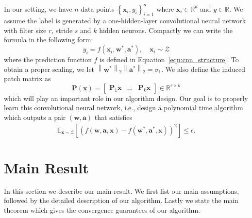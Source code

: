 \documentclass[11pt]{article}
\newcommand{\mat}[1]{\mathbf{#1}}
\newcommand{\vect}[1]{\mathbf{#1}}
\newcommand{\norm}[1]{\left\|#1\right\|}
\newcommand{\expect}{\mathbb{E}}
\newcommand{\inputdist}{\mathcal{Z}}
\begin{document}
In our setting, we have $n$ data points $\left\{\vect{x}_i,y_i\right\}_{i=1}^n$ where $\vect{x}_i \in \mathbb{R}^d$ and $y \in \mathbb{R}$.
We assume the label is generated by a one-hidden-layer convolutional neural network with filter size $r$, stride $s$ and $k$ hidden neurons.
Compactly we can write the formula in the following form:
 \[
y_i = f(\vect{x}_i,\vect{w}^*,\vect{a}^*),\quad \vect{x}_i \sim \inputdist
\] where  the prediction function $f$  is defined in Equation~\eqref{eqn:cnn_structure}.
To obtain a proper scaling, we let $\norm{\vect{w}^*}_2\norm{\vect{a}^*}_2 = \sigma_1$.
We also define the induced patch matrix as \[
\mat{P}\left(\vect{x}\right) = \begin{bmatrix}
\mat{P}_1\vect{x} & \ldots & \mat{P}_k \vect{x}
\end{bmatrix} \in \mathbb{R}^{r \times k}
\]
which will play an important role in our algorithm design.
Our goal is to properly learn this convolutional neural network, i.e., design a polynomial time algorithm which outputs a pair $(\vect{w},\vect{a})$ that satisfies \begin{align*}
	\expect_{\vect{x} \sim \inputdist}\left[ \left(f(\vect{w},\vect{a},\vect{x})-f(\vect{w}^*,\vect{a}^*,\vect{x})\right)^2\right] \le \epsilon.
\end{align*}

\section{Main Result}
\label{sec:main}
In this section we describe our main result. We first list our main assumptions, followed by the detailed description of our algorithm. Lastly we state the main theorem  which gives the convergence guarantees of our algorithm.
\end{document}
